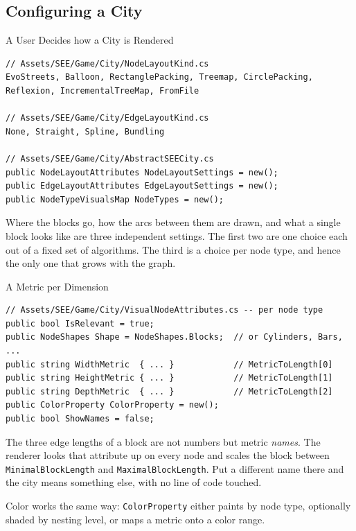 \subsection{Configuring a City}

\begin{frame}[fragile]{A User Decides how a City is Rendered}
  \begin{lstlisting}[basicstyle=\scriptsize\ttfamily]
// Assets/SEE/Game/City/NodeLayoutKind.cs
EvoStreets, Balloon, RectanglePacking, Treemap, CirclePacking,
Reflexion, IncrementalTreeMap, FromFile

// Assets/SEE/Game/City/EdgeLayoutKind.cs
None, Straight, Spline, Bundling

// Assets/SEE/Game/City/AbstractSEECity.cs
public NodeLayoutAttributes NodeLayoutSettings = new();
public EdgeLayoutAttributes EdgeLayoutSettings = new();
public NodeTypeVisualsMap NodeTypes = new();
  \end{lstlisting}
  \vspace{1ex}

  Where the blocks go, how the arcs between them are drawn, and what a single
  block looks like are three independent settings. The first two are one choice
  each out of a fixed set of algorithms. The third is a choice per node type,
  and hence the only one that grows with the graph.
\end{frame}

\begin{frame}[fragile]{A Metric per Dimension}
  \begin{lstlisting}[basicstyle=\scriptsize\ttfamily]
// Assets/SEE/Game/City/VisualNodeAttributes.cs -- per node type
public bool IsRelevant = true;
public NodeShapes Shape = NodeShapes.Blocks;  // or Cylinders, Bars, ...
public string WidthMetric  { ... }            // MetricToLength[0]
public string HeightMetric { ... }            // MetricToLength[1]
public string DepthMetric  { ... }            // MetricToLength[2]
public ColorProperty ColorProperty = new();
public bool ShowNames = false;
  \end{lstlisting}
  \vspace{1ex}

  The three edge lengths of a block are not numbers but metric \emph{names}.
  The renderer looks that attribute up on every node and scales the block
  between \texttt{MinimalBlockLength} and \texttt{MaximalBlockLength}. Put a
  different name there and the city means something else, with no line of code
  touched.
  \vspace{1ex}

  Color works the same way: \texttt{ColorProperty} either paints by node type,
  optionally shaded by nesting level, or maps a metric onto a color range.
\end{frame}

